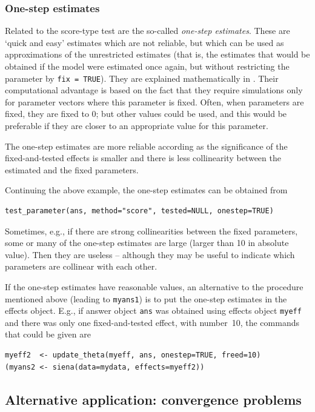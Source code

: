 \documentclass[a4paper,fleqn,11pt]{article}
\newcommand{\+}{\, + \,}
\begin{document}
\subsubsection{One-step estimates}

Related to the score-type test are the so-called \emph{one-step estimates}.
These are `quick and easy' estimates which are not
reliable, but which can be used as approximations of the unrestricted estimates
(that is, the estimates that would be obtained if the model were estimated
once again, but without restricting the parameter by \texttt{fix = TRUE}).
They are explained mathematically in \citet{Schweinberger12}.
Their computational advantage is based on the fact that they require simulations
only for parameter vectors where this parameter is fixed.
Often, when parameters are fixed, they are fixed to 0;
but other values could be used, and this would be preferable if they are closer
to an appropriate value for this parameter.

The one-step estimates are more reliable according as
the significance of the fixed-and-tested effects is smaller
and there is less collinearity
between the estimated and the fixed parameters.

Continuing the above example, the one-step estimates can be obtained from
\begin{verbatim}
test_parameter(ans, method="score", tested=NULL, onestep=TRUE)
\end{verbatim}
Sometimes, e.g., if there are strong collinearities between the fixed
parameters, some or many of the one-step estimates are large (larger than 10
in absolute value). Then they are useless -- although they may be useful to indicate
which parameters are collinear with each other.

If the one-step estimates have reasonable values,
an alternative to the procedure mentioned above (leading to \texttt{myans1})
is to put the one-step estimates in the effects object.
E.g., if answer object \texttt{ans} was obtained using effects object \texttt{myeff}
and there was only one fixed-and-tested effect, with number~10, the
commands that could be given are
\begin{verbatim}
myeff2  <- update_theta(myeff, ans, onestep=TRUE, freed=10)
(myans2 <- siena(data=mydata, effects=myeff2))
\end{verbatim}


\subsection{Alternative application: convergence problems}
\label{alternative}
\end{document}
